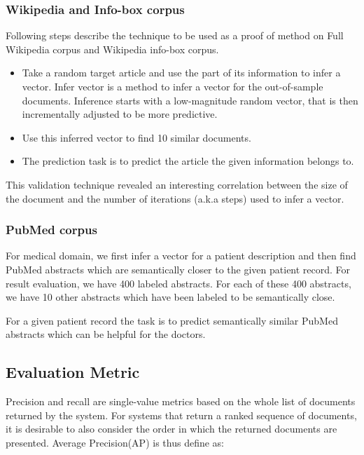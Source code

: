 \documentclass[12pt,a4paper] {article}
\begin{document}
\subsubsection*{Wikipedia and Info-box corpus}
Following steps describe the technique to be used as a proof of method on Full Wikipedia corpus and Wikipedia info-box corpus. 

\begin{itemize}
	
	
	
	\item Take a random target article and use the part of its information to infer a vector. Infer vector is a method to infer a vector for the out-of-sample documents. Inference starts with a low-magnitude random vector, that is then incrementally adjusted to be more predictive.
	
	\item Use this inferred vector to find 10 similar documents.
	\item The prediction task is to predict the article the given information belongs to.
	
\end{itemize}


This validation technique revealed an interesting correlation between the size of the document and the number of iterations (a.k.a steps)  used to infer a vector.

\subsubsection*{PubMed corpus}

For medical domain, we first infer a vector for a patient description and then find PubMed abstracts which are semantically closer to the given patient record.
For result evaluation, we have 400 labeled abstracts. For each of these 400 abstracts, we have 10 other abstracts which have been labeled to be semantically close. 

For a given patient record the task is to predict semantically similar PubMed abstracts which can be helpful for the doctors.



\subsection*{Evaluation Metric}
Precision and recall are single-value metrics based on the whole list of documents returned by the system. For systems that return a ranked sequence of documents, it is desirable to also consider the order in which the returned documents are presented. Average Precision(AP) is thus define as:
\end{document}
